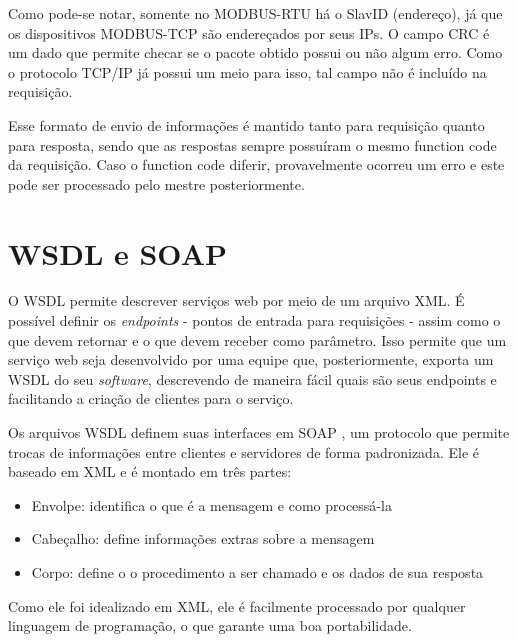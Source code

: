 Como pode-se notar, somente no MODBUS-RTU há o SlavID (endereço), já que os dispositivos MODBUS-TCP são endereçados por seus IPs. O campo CRC é um dado que permite checar se o pacote obtido possui ou não algum erro. Como o protocolo TCP/IP já possui um meio para isso, tal campo não é incluído na requisição.

Esse formato de envio de informações é mantido tanto para requisição quanto para resposta, sendo que as respostas sempre possuíram o mesmo function code da requisição. Caso o function code diferir, provavelmente ocorreu um erro e este pode ser processado pelo mestre posteriormente.

\section{WSDL e SOAP}

O WSDL \cite{wsdlspec} permite descrever serviços web por meio de um arquivo XML. É possível definir os \textit{endpoints} - pontos de entrada para requisições - assim como o que devem retornar e o que devem receber como parâmetro. Isso permite que um serviço web seja desenvolvido por uma equipe que, posteriormente, exporta um WSDL do seu \textit{software}, descrevendo de maneira fácil quais são seus endpoints e facilitando a criação de clientes para o serviço.

Os arquivos WSDL definem suas interfaces em SOAP \cite{soapspec}, um protocolo que permite trocas de informações entre clientes e servidores de forma padronizada. Ele é baseado em XML e é montado em três partes:
\begin{itemize}
  \item Envolpe: identifica o que é a mensagem e como processá-la
  \item Cabeçalho: define informações extras sobre a mensagem
  \item Corpo: define o o procedimento a ser chamado e os dados de sua resposta
\end{itemize}

Como ele foi idealizado em XML, ele é facilmente processado por qualquer linguagem de programação, o que garante uma boa portabilidade.
